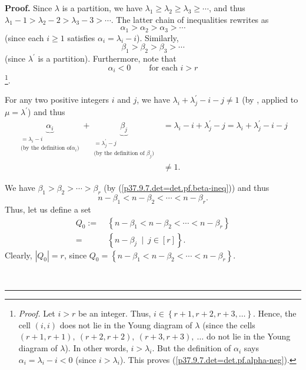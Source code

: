\documentclass[numbers=enddot,12pt,final,onecolumn,notitlepage]{scrartcl}%
\theoremstyle{definition}
\newenvironment{proof}[1][Proof]{\noindent\textbf{#1.} }{\ \rule{0.5em}{0.5em}}
\begin{document}
\begin{enumerate}
\begin{proof}
Since $\lambda$ is a partition, we have $\lambda_{1}\geq\lambda_{2}\geq
\lambda_{3}\geq\cdots$, and thus $\lambda_{1}-1>\lambda_{2}-2>\lambda
_{3}-3>\cdots$. The latter chain of inequalities rewrites as%
\begin{equation}
\alpha_{1}>\alpha_{2}>\alpha_{3}>\cdots\label{p37.9.7.det=det.pf.alpha-ineq}%
\end{equation}
(since each $i\geq1$ satisfies $\alpha_{i}=\lambda_{i}-i$). Similarly,%
\begin{equation}
\beta_{1}>\beta_{2}>\beta_{3}>\cdots\label{p37.9.7.det=det.pf.beta-ineq}%
\end{equation}
(since $\lambda^{\prime}$ is a partition). Furthermore, note that%
\begin{equation}
\alpha_{i}<0\ \ \ \ \ \ \ \ \ \ \text{for each }i>r
\label{p37.9.7.det=det.pf.alpha-neg}%
\end{equation}
\footnote{\textit{Proof.} Let $i>r$ be an integer. Thus, $i\in\left\{
r+1,r+2,r+3,\ldots\right\}  $. Hence, the cell $\left(  i,i\right)  $ does not
lie in the Young diagram of $\lambda$ (since the cells $\left(
r+1,r+1\right)  ,\ \left(  r+2,r+2\right)  ,\ \left(  r+3,r+3\right)
,\ \ldots$ do not lie in the Young diagram of $\lambda$). In other words,
$i>\lambda_{i}$. But the definition of $\alpha_{i}$ says $\alpha_{i}%
=\lambda_{i}-i<0$ (since $i>\lambda_{i}$). This proves
(\ref{p37.9.7.det=det.pf.alpha-neg}).}.

For any two positive integers $i$ and $j$, we have $\lambda_{i}+\lambda
_{j}^{\prime}-i-j\neq1$ (by \cite[Proposition 3.18 \textbf{(c)}]{petriesym},
applied to $\mu=\lambda^{\prime}$) and thus%
\begin{align}
\underbrace{\alpha_{i}}_{\substack{=\lambda_{i}-i\\\text{(by the definition of
}\alpha_{i}\text{)}}}+\underbrace{\beta_{j}}_{\substack{=\lambda_{j}^{\prime
}-j\\\text{(by the definition of }\beta_{j}\text{)}}}  &  =\lambda
_{i}-i+\lambda_{j}^{\prime}-j=\lambda_{i}+\lambda_{j}^{\prime}-i-j\nonumber\\
&  \neq1. \label{p37.9.7.det=det.pf.not1}%
\end{align}


We have $\beta_{1}>\beta_{2}>\cdots>\beta_{r}$ (by
(\ref{p37.9.7.det=det.pf.beta-ineq})) and thus
\[
n-\beta_{1}<n-\beta_{2}<\cdots<n-\beta_{r}.
\]
Thus, let us define a set%
\begin{align*}
Q_{0}:=  &  \ \left\{  n-\beta_{1}<n-\beta_{2}<\cdots<n-\beta_{r}\right\} \\
=  &  \ \left\{  n-\beta_{j}\ \mid\ j\in\left[  r\right]  \right\}  .
\end{align*}
Clearly, $\left\vert Q_{0}\right\vert =r$, since $Q_{0}=\left\{  n-\beta
_{1}<n-\beta_{2}<\cdots<n-\beta_{r}\right\}  $.


\end{proof}
\end{enumerate}
\end{document}
